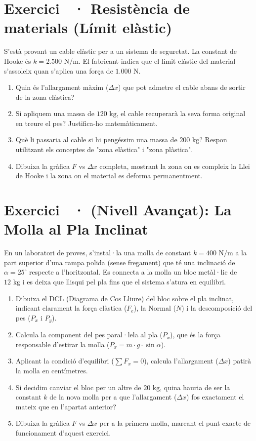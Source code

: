 \documentclass[12pt,a4paper,twoside]{article}
\newcounter{exercici}
\newcommand{\exercici}[1]{%
  \stepcounter{exercici}
  \section*{Exercici \theexercici\ \textnormal{· #1}}
  \vspace{-10pt}
}
\begin{document}
\clearpage


\vspace{0.5cm}
\exercici{Resistència de materials (Límit elàstic)}
S'està provant un cable elàstic per a un sistema de seguretat. La constant de Hooke és $k = 2.500\text{ N/m}$. El fabricant indica que el límit elàstic del material s'assoleix quan s'aplica una força de $1.000\text{ N}$.
\begin{enumerate}[label=\textbf{\alph*)}]
  \item Quin és l'allargament màxim ($\Delta x$) que pot admetre el cable abans de sortir de la zona elàstica?
  \item Si apliquem una massa de $120\text{ kg}$, el cable recuperarà la seva forma original en treure el pes? Justifica-ho matemàticament.
  \item Què li passaria al cable si hi pengéssim una massa de $200\text{ kg}$? Respon utilitzant els conceptes de "zona elàstica" i "zona plàstica".
  \item Dibuixa la gràfica $F$ vs $\Delta x$ completa, mostrant la zona on es compleix la Llei de Hooke i la zona on el material es deforma permanentment.
\end{enumerate}

\exercici{(Nivell Avançat): La Molla al Pla Inclinat}
En un laboratori de proves, s'instal·la una molla de constant $k = 400\text{ N/m}$ a la part superior d'una rampa polida (sense fregament) que té una inclinació de $\alpha = 25^\circ$ respecte a l'horitzontal. Es connecta a la molla un bloc metàl·lic de $12\text{ kg}$ i es deixa que llisqui pel pla fins que el sistema s'atura en equilibri.
\begin{enumerate}[label=\textbf{\alph*)}]
  \item Dibuixa el DCL (Diagrama de Cos Lliure) del bloc sobre el pla inclinat, indicant clarament la força elàstica ($F_e$), la Normal ($N$) i la descomposició del pes ($P_x$ i $P_y$).
  \item Calcula la component del pes paral·lela al pla ($P_x$), que és la força responsable d'estirar la molla ($P_x = m \cdot g \cdot \sin \alpha$).
  \item Aplicant la condició d'equilibri ($\sum F_x = 0$), calcula l'allargament ($\Delta x$) patirà la molla en centímetres.
  \item Si decidim canviar el bloc per un altre de $20\text{ kg}$, quina hauria de ser la constant $k$ de la nova molla per a que l'allargament ($\Delta x$) fos exactament el mateix que en l'apartat anterior?
  \item Dibuixa la gràfica $F$ vs $\Delta x$ per a la primera molla, marcant el punt exacte de funcionament d'aquest exercici.
\end{enumerate}
\end{document}
